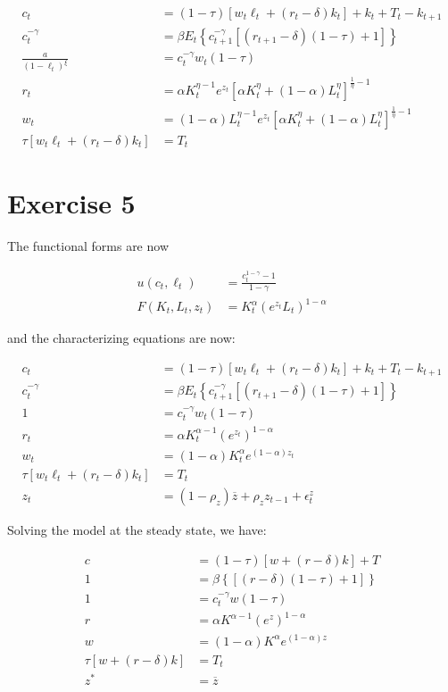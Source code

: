 \documentclass[11pt]{article}
\numberwithin{equation}{section}
\theoremstyle{plain}
\theoremstyle{definition}
\newcommand\parens[1]{\left( #1 \right)}
\newcommand{\1}{\mathbbm 1}
\def\a{\alpha}
\def\g{\gamma}
\begin{document}
\begin{align}
c_{t}&=(1-\tau)\left[w_{t} \ell_{t}+\left(r_{t}-\delta\right) k_{t}\right]+k_{t}+T_{t}-k_{t+1} \\
c_t^{-\g}&=\beta E_{t}\left\{c_{t+1}^{-\g}\left[\left(r_{t+1}-\delta\right)(1-\tau)+1\right]\right\} \\
\frac{a}{(1-\ell_t)^{\xi}}&=c_t^{-\g} w_{t}(1-\tau) \\
r_{t}&=\a K_{t}^{\eta - 1} e^{z_{t}} \left[\alpha K_{t}^{\eta}+(1-\alpha) L_{t}^{\eta}\right]^{\frac{1}{\eta} - 1} \\
w_{t}&=(1-\a) L_{t}^{\eta - 1} e^{z_{t}} \left[\alpha K_{t}^{\eta}+(1-\alpha) L_{t}^{\eta}\right]^{\frac{1}{\eta} - 1} \\
\tau\left[w_{t} \ell_{t}+\left(r_{t}-\delta\right) k_{t}\right]&=T_{t}
\end{align}


\section{Exercise 5}
The functional forms are now 

\begin{align} 
 u\left(c_{t}, \ell_{t}\right) &=\frac{c_{t}^{1-\gamma}-1}{1-\gamma} \\ 
 F\left(K_{t}, L_{t}, z_{t}\right) &= K_{t}^{\alpha} \parens{e^{z_{t}} L_{t}}^{1-\alpha} 
 \end{align}

and the characterizing equations are now:

\begin{align}
c_{t}&=(1-\tau)\left[w_{t} \ell_{t}+\left(r_{t}-\delta\right) k_{t}\right]+k_{t}+T_{t}-k_{t+1} \\
c_t^{-\g}&=\beta E_{t}\left\{c_{t+1}^{-\g}\left[\left(r_{t+1}-\delta\right)(1-\tau)+1\right]\right\} \\
1&=c_t^{-\g} w_{t}(1-\tau) \\
r_{t}&=\a K_{t}^{\alpha - 1} \parens{e^{z_{t}}}^{1-\alpha} \\
w_{t}&=(1-\a)K_{t}^{\alpha} e^{(1- \alpha) z_{t}} \\
\tau\left[w_{t} \ell_{t}+\left(r_{t}-\delta\right) k_{t}\right]&=T_t \\
z_{t}&=\left(1-\rho_{z}\right) \overline{z}+\rho_{z} z_{t-1}+
\epsilon_{t}^{z}
\end{align}


Solving the model at the steady state, we have:

\begin{align}
c&=(1-\tau)\left[w+\left(r-\delta\right) k\right]+T \\
1&=\beta \left\{\left[\left(r-\delta\right)(1-\tau)+1\right]\right\} \\
1&=c_t^{-\g} w(1-\tau) \\
r&=\a K^{\alpha - 1} \parens{e^{z}}^{1-\alpha} \\
w&=(1-\a)K^{\alpha} e^{(1- \alpha) z} \\
\tau\left[w+\left(r-\delta\right) k\right]&=T_t \\
z^{*}&=\overline{z}
\end{align}
\end{document}
